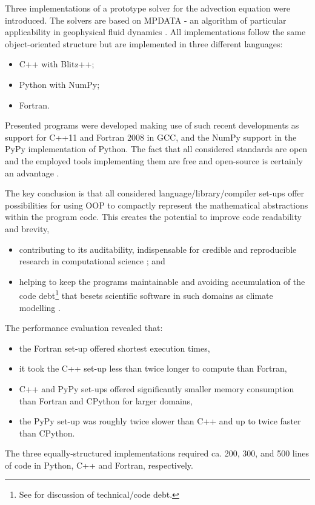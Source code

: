 \documentclass[gmd]{copernicus}%
\begin{document}

  Three implementations of a prototype solver 
    for the advection equation were introduced.
  The solvers are based on MPDATA - an algorithm of particular applicability
    in geophysical fluid dynamics \citep{Smolarkiewicz_2006}.
  All implementations follow the same object-oriented structure but are implemented
    in three different languages:
  \begin{itemize}
    \item{C++ with Blitz++;}
    \item{Python with NumPy;}
    \item{Fortran.}
  \end{itemize}

  Presented programs were developed making use of such recent
    developments as support for C++11 and Fortran 2008 in GCC, and
    the NumPy support in the PyPy implementation of Python.
  The fact that all considered standards are open and the employed
    tools implementing them are free and open-source
    is certainly an advantage \citep{Anel_2011}.

  The key conclusion is that all considered language/library/compiler
    set-ups offer possibilities for using OOP to compactly 
    represent the mathematical abstractions within the program code. 
  This creates the potential to improve code readability and brevity,
  \begin{itemize}
    \item{contributing to its 
      auditability, indispensable for credible and reproducible research in computational science 
      \citep{Post_et_al_2005, Merali_et_al_2010, Stodden_et_al_2012}; and
    }
    \item{helping to keep the programs maintainable and avoiding accumulation of the code 
      debt\footnote{See \citet{Buschmann_2011} for discussion of technical/code debt.} 
      that besets scientific software in such domains as climate modelling
      \citep{Freeman_et_al_2010}.
    }
  \end{itemize}
  \noindent 
  The performance evaluation revealed that:
    \begin{itemize}
      \item{the Fortran set-up offered shortest execution times,}
      \item{it took the C++ set-up less than twice longer to compute than Fortran,}
      \item{C++ and PyPy set-ups offered significantly smaller memory consumption 
        than Fortran and CPython for larger domains,}
      \item{the PyPy set-up was roughly twice slower than C++ and up to twice faster than CPython.}
    \end{itemize}
  The three equally-structured implementations required ca. 200, 300, and 500 lines of code 
    in Python, C++ and Fortran, respectively.  
\end{document}
